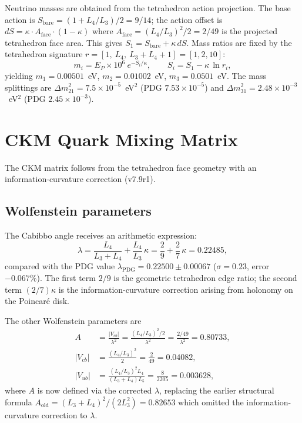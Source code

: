 \documentclass[aps,prd,reprint,twocolumn,showpacs,superscriptaddress]{revtex4-2}
\begin{document}
Neutrino masses are obtained from the tetrahedron action projection.
The base action is $S_{\text{bare}} = (1+L_4/L_3)/2 = 9/14$;
the action offset is $dS = \kappa \cdot A_{\text{face}} \cdot (1-\kappa)$
where $A_{\text{face}} = (L_4/L_3)^2/2 = 2/49$ is the projected
tetrahedron face area.  This gives $S_1 = S_{\text{bare}} + \kappa\,dS$.
Mass ratios are fixed by the tetrahedron signature
$r = [1,\ L_4,\ L_3+L_4+1] = [1,2,10]$:
\begin{equation}
m_i = E_P \times 10^6\ e^{-S_i/\kappa}, \qquad
S_i = S_1 - \kappa\,\ln r_i,
\end{equation}
yielding $m_1 = 0.00501$~eV, $m_2 = 0.01002$~eV, $m_3 = 0.0501$~eV.
The mass splittings are $\Delta m_{21}^2 = 7.5\times10^{-5}$~eV$^2$
(PDG $7.53\times10^{-5}$) and
$\Delta m_{31}^2 = 2.48\times10^{-3}$~eV$^2$
(PDG $2.45\times10^{-3}$).

\section{CKM Quark Mixing Matrix}
\label{sec:ckm}

The CKM matrix follows from the tetrahedron face geometry with an
information-curvature correction (v7.9r1).

\subsection{Wolfenstein parameters}

The Cabibbo angle receives an arithmetic expression:
\begin{equation}
\lambda = \frac{L_4}{L_3 + L_4} + \frac{L_4}{L_3}\,\kappa
       = \frac{2}{9} + \frac{2}{7}\,\kappa
       = 0.22485,
\end{equation}
compared with the PDG value $\lambda_{\text{PDG}} = 0.22500 \pm 0.00067$
($\sigma = 0.23$, error $-0.067\%$).  The first term $2/9$ is the
geometric tetrahedron edge ratio; the second term $(2/7)\kappa$ is
the information-curvature correction arising from holonomy on the
Poincar\'{e} disk.

The other Wolfenstein parameters are
\begin{align}
A &= \frac{|V_{cb}|}{\lambda^2}
   = \frac{(L_4/L_3)^2/2}{\lambda^2}
   = \frac{2/49}{\lambda^2}
   = 0.80733, \\
|V_{cb}| &= \frac{(L_4/L_3)^2}{2} = \frac{2}{49} = 0.04082, \\
|V_{ub}| &= \frac{(L_4/L_3)^2 L_4}{(L_3+L_4)L_5}
         = \frac{8}{2205} = 0.003628,
\end{align}
where $A$ is now defined via the corrected $\lambda$, replacing the
earlier structural formula $A_{\text{old}} = (L_3+L_4)^2/(2 L_3^2) = 0.82653$
which omitted the information-curvature correction to $\lambda$.
\end{document}
